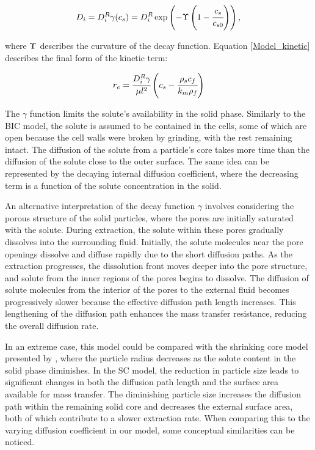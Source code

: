 \documentclass[a4paper,fleqn]{cas-dc}
\begin{document}
	{\footnotesize
		\begin{equation}
			D_i = D_i^R \gamma(c_s) = D_i^R \exp \left( - \Upsilon \left( 1-\cfrac{ c_s }{c_{s0}} \right) \right), \label{EQ: C_sat_function}
	\end{equation} }
	
	where  ${\color{black}\Upsilon}$ describes the curvature of the decay function. Equation \ref{Model_kinetic} describes the final form of the kinetic term:
	
	{\footnotesize
		\begin{equation}
			\label{Model_kinetic}
			r_e = \cfrac{D_i^R \gamma }{ \mu l^2 } \left( c_s  - \cfrac{\rho_s c_f }{ k_m \rho_f }  \right)
	\end{equation} }
	
	The $\gamma$ function limits the solute's availability in the solid phase. Similarly to the BIC model, the solute is assumed to be contained in the cells, some of which are open because the cell walls were broken by grinding, with the rest remaining intact. The diffusion of the solute from a particle's core takes more time than the diffusion of the solute close to the outer surface. The same idea can be represented by the decaying internal diffusion coefficient, where the decreasing term is a function of the solute concentration in the solid. 
	
	An alternative interpretation of the decay function $\gamma$ involves considering the porous structure of the solid particles, where the pores are initially saturated with the solute. During extraction, the solute within these pores gradually dissolves into the surrounding fluid. Initially, the solute molecules near the pore openings dissolve and diffuse rapidly due to the short diffusion paths. As the extraction progresses, the dissolution front moves deeper into the pore structure, and solute from the inner regions of the pores begins to dissolve. The diffusion of solute molecules from the interior of the pores to the external fluid becomes progressively slower because the effective diffusion path length increases. This lengthening of the diffusion path enhances the mass transfer resistance, reducing the overall diffusion rate. 
	
	In an extreme case, this model could be compared with the shrinking core model presented by \citet{Goto1996}, where the particle radius decreases as the solute content in the solid phase diminishes. In the SC model, the reduction in particle size leads to significant changes in both the diffusion path length and the surface area available for mass transfer. The diminishing particle size increases the diffusion path within the remaining solid core and decreases the external surface area, both of which contribute to a slower extraction rate. When comparing this to the varying diffusion coefficient in our model, some conceptual similarities can be noticed.
	
\end{document}
